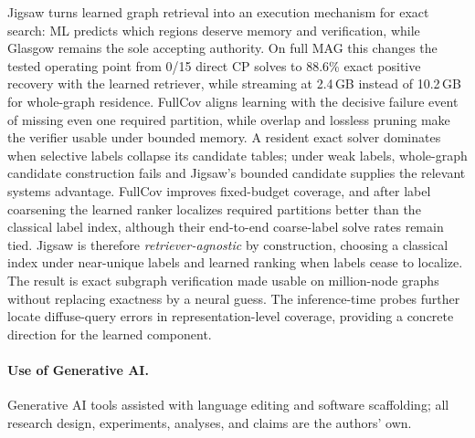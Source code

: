 \documentclass[runningheads]{llncs}
\begin{document}
Jigsaw turns learned graph retrieval into an execution mechanism for exact search: ML predicts which regions deserve memory and verification, while Glasgow remains the sole accepting authority. On full MAG this changes the tested operating point from 0/15 direct CP solves to 88.6\% exact positive recovery with the learned retriever, while streaming at 2.4\,GB instead of 10.2\,GB for whole-graph residence. FullCov aligns learning with the decisive failure event of missing even one required partition, while overlap and lossless pruning make the verifier usable under bounded memory. A resident exact solver dominates when selective labels collapse its candidate tables; under weak labels, whole-graph candidate construction fails and Jigsaw's bounded candidate supplies the relevant systems advantage. FullCov improves fixed-budget coverage, and after label coarsening the learned ranker localizes required partitions better than the classical label index, although their end-to-end coarse-label solve rates remain tied. Jigsaw is therefore \emph{retriever-agnostic} by construction, choosing a classical index under near-unique labels and learned ranking when labels cease to localize. The result is exact subgraph verification made usable on million-node graphs without replacing exactness by a neural guess. The inference-time probes further locate diffuse-query errors in representation-level coverage, providing a concrete direction for the learned component.

\paragraph{Use of Generative AI.}
Generative AI tools assisted with language editing and software scaffolding; all research design, experiments, analyses, and claims are the authors' own.
\end{document}
